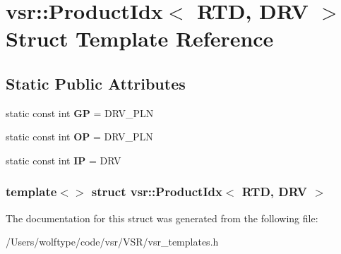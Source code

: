 \hypertarget{structvsr_1_1_product_idx_3_01_r_t_d_00_01_d_r_v_01_4}{\section{vsr\-:\-:Product\-Idx$<$ R\-T\-D, D\-R\-V $>$ Struct Template Reference}
\label{structvsr_1_1_product_idx_3_01_r_t_d_00_01_d_r_v_01_4}
}
\subsection*{Static Public Attributes}
\begin{DoxyCompactItemize}
\item 
\hypertarget{structvsr_1_1_product_idx_3_01_r_t_d_00_01_d_r_v_01_4_a5c562eb3fd55fd954aa82c7239268ba4}{static const int {\bfseries G\-P} = D\-R\-V\-\_\-\-P\-L\-N}\label{structvsr_1_1_product_idx_3_01_r_t_d_00_01_d_r_v_01_4_a5c562eb3fd55fd954aa82c7239268ba4}

\item 
\hypertarget{structvsr_1_1_product_idx_3_01_r_t_d_00_01_d_r_v_01_4_a4e1e0b5039fdf6256429ba7182521a8b}{static const int {\bfseries O\-P} = D\-R\-V\-\_\-\-P\-L\-N}\label{structvsr_1_1_product_idx_3_01_r_t_d_00_01_d_r_v_01_4_a4e1e0b5039fdf6256429ba7182521a8b}

\item 
\hypertarget{structvsr_1_1_product_idx_3_01_r_t_d_00_01_d_r_v_01_4_ae782018525845b3f666f230ac8997f58}{static const int {\bfseries I\-P} = D\-R\-V}\label{structvsr_1_1_product_idx_3_01_r_t_d_00_01_d_r_v_01_4_ae782018525845b3f666f230ac8997f58}

\end{DoxyCompactItemize}
\subsubsection*{template$<$$>$ struct vsr\-::\-Product\-Idx$<$ R\-T\-D, D\-R\-V $>$}



The documentation for this struct was generated from the following file\-:\begin{DoxyCompactItemize}
\item 
/\-Users/wolftype/code/vsr/\-V\-S\-R/vsr\-\_\-templates.\-h\end{DoxyCompactItemize}
